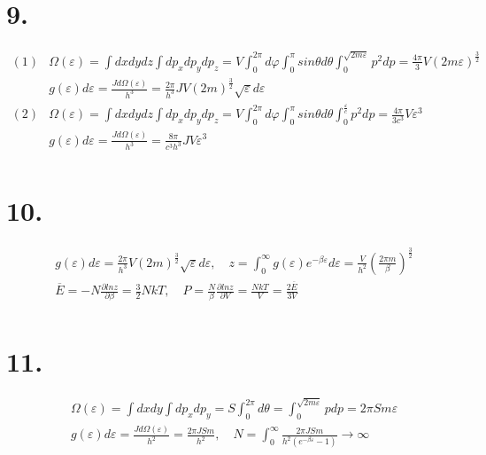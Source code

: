 \documentclass[UTF8]{ctexart}
\begin{document}
\section*{9.}
\begin{equation*}
  \begin{aligned}
    (1) & \Omega(\varepsilon)=\int dxdydz\int dp_xdp_ydp_z=V\int_0^{2\pi}d\varphi\int_0
    ^\pi sin\theta d\theta\int_0^{\sqrt{2m\varepsilon}}p^2dp=\frac{4\pi}{3}V(2m
    \varepsilon)^{\frac{3}{2}}                                                               \\
        & g(\varepsilon)d\varepsilon=\frac{Jd\Omega(\varepsilon)}{h^3}=\frac{2\pi}{h^3}JV
    (2m)^{\frac{3}{2}}\sqrt\varepsilon d\varepsilon                                          \\
    (2) & \Omega(\varepsilon)=\int dxdydz\int dp_xdp_ydp_z=V\int_0^{2\pi}d\varphi\int_0
    ^\pi sin\theta d\theta\int_0^{\frac{\varepsilon}{c}}p^2dp=\frac{4\pi}{3c^3}V
    \varepsilon^3                                                                            \\
        & g(\varepsilon)d\varepsilon=\frac{Jd\Omega(\varepsilon)}{h^3}=\frac{8\pi}{c^3h^3}JV
    \varepsilon^3                                                                            \\
  \end{aligned}
\end{equation*}
\section*{10.}
\begin{equation*}
  \begin{aligned}
     & g(\varepsilon)d\varepsilon=\frac{2\pi}{h^3}V(2m)^{\frac{3}{2}}\sqrt{\varepsilon}d
    \varepsilon,\quad z=\int_0^\infty g(\varepsilon)e^{-\beta\varepsilon}d\varepsilon
    =\frac{V}{h^2}(\frac{2\pi m}{\beta})^{\frac{3}{2}}                                   \\
     & \overline{E}=-N\frac{\partial lnz}{\partial\beta}=\frac{3}{2}NkT,\quad
    P=\frac{N}{\beta}\frac{\partial lnz}{\partial V}=\frac{NkT}{V}=\frac{2\overline{E}}
    {3V}                                                                                 \\
  \end{aligned}
\end{equation*}
\section*{11.}
\begin{equation*}
  \begin{aligned}
     & \Omega(\varepsilon)=\int dxdy\int dp_xdp_y=S\int_0^{2\pi}d\theta=\int_0^{\sqrt{2m
    \varepsilon}}pdp=2\pi Sm\varepsilon                                                   \\
     & g(\varepsilon)d\varepsilon=\frac{Jd\Omega(\varepsilon)}{h^2}=\frac{2\pi JSm}{h^2},
    \quad N=\int_0^\infty\frac{2\pi JSm}{h^2(e^{-\beta\varepsilon}-1)}\to\infty           \\
  \end{aligned}
\end{equation*}
\end{document}
